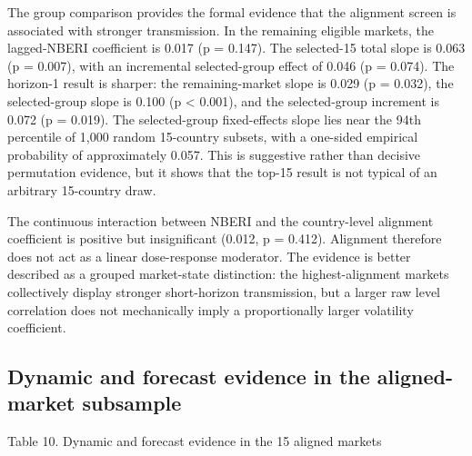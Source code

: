 \documentclass[11pt]{article}
\begin{document}
The group comparison provides the formal evidence that the alignment
screen is associated with stronger transmission. In the remaining
eligible markets, the lagged-NBERI coefficient is 0.017 (p = 0.147). The
selected-15 total slope is 0.063 (p = 0.007), with an incremental
selected-group effect of 0.046 (p = 0.074). The horizon-1 result is
sharper: the remaining-market slope is 0.029 (p = 0.032), the
selected-group slope is 0.100 (p \textless{} 0.001), and the
selected-group increment is 0.072 (p = 0.019). The selected-group
fixed-effects slope lies near the 94th percentile of 1,000 random
15-country subsets, with a one-sided empirical probability of
approximately 0.057. This is suggestive rather than decisive permutation
evidence, but it shows that the top-15 result is not typical of an
arbitrary 15-country draw.

The continuous interaction between NBERI and the country-level alignment
coefficient is positive but insignificant (0.012, p = 0.412). Alignment
therefore does not act as a linear dose-response moderator. The evidence
is better described as a grouped market-state distinction: the
highest-alignment markets collectively display stronger short-horizon
transmission, but a larger raw level correlation does not mechanically
imply a proportionally larger volatility coefficient.

\subsection{Dynamic and forecast evidence in the aligned-market
subsample}\label{dynamic-and-forecast-evidence-in-the-aligned-market-subsample}

Table 10. Dynamic and forecast evidence in the 15 aligned markets
\end{document}
